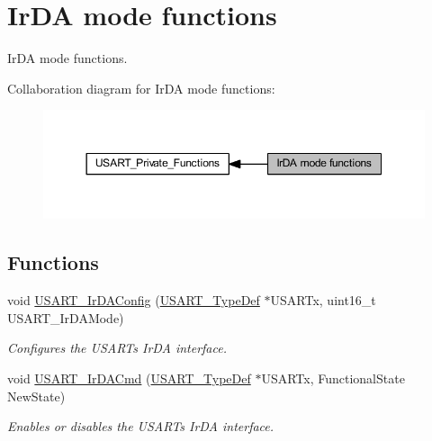 \hypertarget{group___u_s_a_r_t___group7}{}\section{Ir\+DA mode functions}
\label{group___u_s_a_r_t___group7}


Ir\+DA mode functions.  


Collaboration diagram for Ir\+DA mode functions\+:\nopagebreak
\begin{figure}[H]
\begin{center}
\leavevmode
\includegraphics[width=350pt]{group___u_s_a_r_t___group7}
\end{center}
\end{figure}
\subsection*{Functions}
\begin{DoxyCompactItemize}
\item 
void \hyperlink{group___u_s_a_r_t___group7_ga81a0cd36199040bf6d266b57babd678e}{U\+S\+A\+R\+T\+\_\+\+Ir\+D\+A\+Config} (\hyperlink{struct_u_s_a_r_t___type_def}{U\+S\+A\+R\+T\+\_\+\+Type\+Def} $\ast$U\+S\+A\+R\+Tx, uint16\+\_\+t U\+S\+A\+R\+T\+\_\+\+Ir\+D\+A\+Mode)
\begin{DoxyCompactList}\small\item\em Configures the U\+S\+A\+RT\textquotesingle{}s Ir\+DA interface. \end{DoxyCompactList}\item 
void \hyperlink{group___u_s_a_r_t___group7_gabff56ebb494fdfadcc6ef4fe9ac8dd24}{U\+S\+A\+R\+T\+\_\+\+Ir\+D\+A\+Cmd} (\hyperlink{struct_u_s_a_r_t___type_def}{U\+S\+A\+R\+T\+\_\+\+Type\+Def} $\ast$U\+S\+A\+R\+Tx, Functional\+State New\+State)
\begin{DoxyCompactList}\small\item\em Enables or disables the U\+S\+A\+RT\textquotesingle{}s Ir\+DA interface. \end{DoxyCompactList}\end{DoxyCompactItemize}


